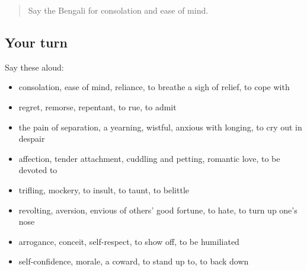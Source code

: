 \label{lesson:BN-R453-review-446-453}



\begin{quote}
Say the Bengali for consolation and ease of mind.
\end{quote}

\subsection*{Your turn}
Say these aloud:

\begin{itemize}
\raggedright
  \item consolation, ease of mind, reliance, to breathe a sigh of relief, to cope with
  \item regret, remorse, repentant, to rue, to admit
  \item the pain of separation, a yearning, wistful, anxious with longing, to cry out in despair
  \item affection, tender attachment, cuddling and petting, romantic love, to be devoted to
  \item trifling, mockery, to insult, to taunt, to belittle
  \item revolting, aversion, envious of others' good fortune, to hate, to turn up one's nose
  \item arrogance, conceit, self-respect, to show off, to be humiliated
  \item self-confidence, morale, a coward, to stand up to, to back down
\end{itemize}

